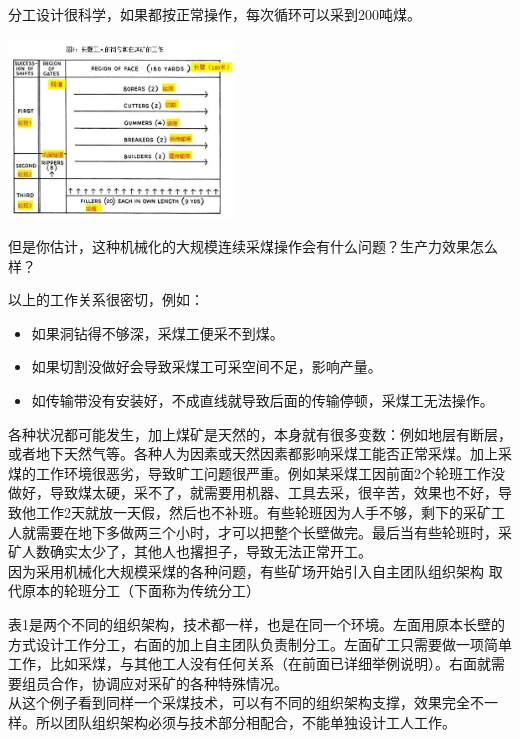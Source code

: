 分工设计很科学，如果都按正常操作，每次循环可以采到200吨煤。


\includegraphics[width=6cm]{长壁11.jpg}

但是你估计，这种机械化的大规模连续采煤操作会有什么问题？生产力效果怎么样？

以上的工作关系很密切，例如：

\begin{itemize}
\tightlist
\item
  如果洞钻得不够深，采煤工便采不到煤。
\item
  如果切割没做好会导致采煤工可采空间不足，影响产量。
\item
  如传输带没有安装好，不成直线就导致后面的传输停顿，采煤工无法操作。
\end{itemize}

各种状况都可能发生，加上煤矿是天然的，本身就有很多变数：例如地层有断层，或者地下天然气等。各种人为因素或天然因素都影响采煤工能否正常采煤。加上采煤的工作环境很恶劣，导致旷工问题很严重。例如某采煤工因前面2个轮班工作没做好，导致煤太硬，采不了，就需要用机器、工具去采，很辛苦，效果也不好，导致他工作2天就放一天假，然后也不补班。有些轮班因为人手不够，剩下的采矿工人就需要在地下多做两三个小时，才可以把整个长壁做完。最后当有些轮班时，采矿人数确实太少了，其他人也撂担子，导致无法正常开工。\\
因为采用机械化大规模采煤的各种问题，有些矿场开始引入自主团队组织架构
取代原本的轮班分工（下面称为传统分工）

表1是两个不同的组织架构，技术都一样，也是在同一个环境。左面用原本长壁的方式设计工作分工，右面的加上自主团队负责制分工。左面矿工只需要做一项简单工作，比如采煤，与其他工人没有任何关系（在前面已详细举例说明）。右面就需要组员合作，协调应对采矿的各种特殊情况。\\
从这个例子看到同样一个采煤技术，可以有不同的组织架构支撑，效果完全不一样。所以团队组织架构必须与技术部分相配合，不能单独设计工人工作。


